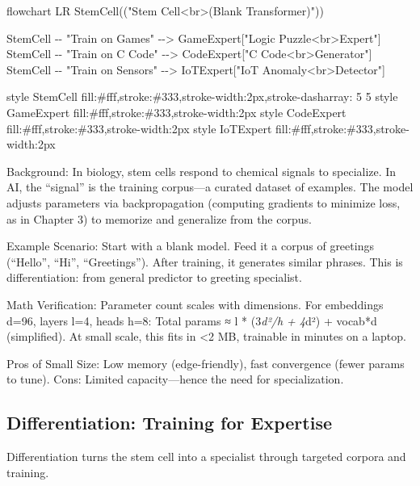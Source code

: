 \documentclass[
]{article}
\newenvironment{Shaded}{}{}
\newcommand{\NormalTok}[1]{#1}
\begin{document}
\begin{Shaded}
\begin{Highlighting}[]
\NormalTok{flowchart LR}
\NormalTok{    StemCell(("Stem Cell\textless{}br\textgreater{}(Blank Transformer)"))}
    
\NormalTok{    StemCell {-}{-} "Train on Games" {-}{-}\textgreater{} GameExpert["Logic Puzzle\textless{}br\textgreater{}Expert"]}
\NormalTok{    StemCell {-}{-} "Train on C Code" {-}{-}\textgreater{} CodeExpert["C Code\textless{}br\textgreater{}Generator"]}
\NormalTok{    StemCell {-}{-} "Train on Sensors" {-}{-}\textgreater{} IoTExpert["IoT Anomaly\textless{}br\textgreater{}Detector"]}
    
\NormalTok{    style StemCell fill:\#fff,stroke:\#333,stroke{-}width:2px,stroke{-}dasharray: 5 5}
\NormalTok{    style GameExpert fill:\#fff,stroke:\#333,stroke{-}width:2px}
\NormalTok{    style CodeExpert fill:\#fff,stroke:\#333,stroke{-}width:2px}
\NormalTok{    style IoTExpert fill:\#fff,stroke:\#333,stroke{-}width:2px}
\end{Highlighting}
\end{Shaded}

Background: In biology, stem cells respond to chemical signals to
specialize. In AI, the ``signal'' is the training corpus---a curated
dataset of examples. The model adjusts parameters via backpropagation
(computing gradients to minimize loss, as in Chapter 3) to memorize and
generalize from the corpus.

Example Scenario: Start with a blank model. Feed it a corpus of
greetings (``Hello'', ``Hi'', ``Greetings''). After training, it
generates similar phrases. This is differentiation: from general
predictor to greeting specialist.

Math Verification: Parameter count scales with dimensions. For
embeddings d=96, layers l=4, heads h=8: Total params ≈ l * (3\emph{d²/h
+ 4}d²) + vocab*d (simplified). At small scale, this fits in \textless2
MB, trainable in minutes on a laptop.

Pros of Small Size: Low memory (edge-friendly), fast convergence (fewer
params to tune). Cons: Limited capacity---hence the need for
specialization.

\subsection{Differentiation: Training for
Expertise}\label{differentiation-training-for-expertise}

Differentiation turns the stem cell into a specialist through targeted
corpora and training.
\end{document}
